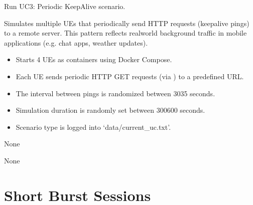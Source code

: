 \documentclass[letterpaper,10pt,english]{sphinxmanual}
\begin{document}
\begin{fulllineitems}
\label{\detokenize{uc3:uc3.run_uc3}}
\pysigstartsignatures
{}
\pysigstopsignatures
\sphinxAtStartPar
Run UC3: Periodic Keep\sphinxhyphen{}Alive scenario.

\sphinxAtStartPar
Simulates multiple UEs that periodically send HTTP requests (keep\sphinxhyphen{}alive pings) to a remote server.
This pattern reflects real\sphinxhyphen{}world background traffic in mobile applications (e.g. chat apps, weather updates).
\begin{description}
\begin{itemize}
\item {} 
\sphinxAtStartPar
Starts 4 UEs as containers using Docker Compose.

\item {} 
\sphinxAtStartPar
Each UE sends periodic HTTP GET requests (via ) to a predefined URL.

\item {} 
\sphinxAtStartPar
The interval between pings is randomized between 30\textendash{}35 seconds.

\item {} 
\sphinxAtStartPar
Simulation duration is randomly set between 300\textendash{}600 seconds.

\item {} 
\sphinxAtStartPar
Scenario type is logged into ‘data/current\_uc.txt’.

\end{itemize}

\sphinxAtStartPar
None

\sphinxAtStartPar
None

\end{description}

\end{fulllineitems}


\sphinxstepscope


\chapter{Short Burst Sessions}
\label{\detokenize{uc4:module-uc4}}\label{\detokenize{uc4:short-burst-sessions}}\label{\detokenize{uc4::doc}}
\end{document}
